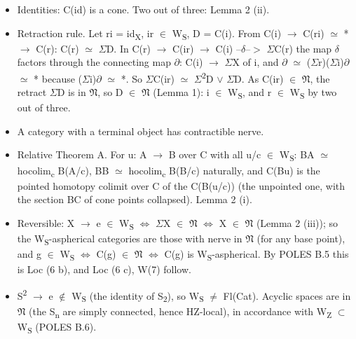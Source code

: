 \begin{itemize}
\item Identities: C(id) is a cone. Two out of three: Lemma 2 (ii).
\item Retraction rule. Let ri = id\textsubscript{X}, ir \ensuremath{\in} W\textsubscript{S}, D = C(i). From C(i) \ensuremath{\to} C(ri) \ensuremath{\simeq} * \ensuremath{\to} C(r): C(r) \ensuremath{\simeq} \ensuremath{\Sigma}D. In
  C(r) \ensuremath{\to} C(ir) \ensuremath{\to} C(i) --\ensuremath{\delta}--\ensuremath{>} \ensuremath{\Sigma}C(r) the map \ensuremath{\delta} factors through the connecting map \ensuremath{\partial}: C(i) \ensuremath{\to} \ensuremath{\Sigma}X of i, and
  \ensuremath{\partial} \ensuremath{\simeq} (\ensuremath{\Sigma}r)(\ensuremath{\Sigma}i)\ensuremath{\partial} \ensuremath{\simeq} * because (\ensuremath{\Sigma}i)\ensuremath{\partial} \ensuremath{\simeq} *. So \ensuremath{\Sigma}C(ir) \ensuremath{\simeq} \ensuremath{\Sigma}\textsuperscript{2}D \ensuremath{\vee} \ensuremath{\Sigma}D. As C(ir) \ensuremath{\in} \ensuremath{\mathfrak N}, the retract \ensuremath{\Sigma}D is in \ensuremath{\mathfrak N},
  so D \ensuremath{\in} \ensuremath{\mathfrak N} (Lemma 1): i \ensuremath{\in} W\textsubscript{S}, and r \ensuremath{\in} W\textsubscript{S} by two out of three.
\item A category with a terminal object has contractible nerve.
\item Relative Theorem A. For u: A \ensuremath{\to} B over C with all u/c \ensuremath{\in} W\textsubscript{S}: BA \ensuremath{\simeq} hocolim\textsubscript{c} B(A/c),
  BB \ensuremath{\simeq} hocolim\textsubscript{c} B(B/c) naturally, and C(Bu) is the pointed homotopy colimit over C of the C(B(u/c))
  (the unpointed one, with the section BC of cone points collapsed). Lemma 2 (i).
\item Reversible: X \ensuremath{\to} e \ensuremath{\in} W\textsubscript{S} \ensuremath{\Leftrightarrow} \ensuremath{\Sigma}X \ensuremath{\in} \ensuremath{\mathfrak N} \ensuremath{\Leftrightarrow} X \ensuremath{\in} \ensuremath{\mathfrak N} (Lemma 2 (iii)); so the W\textsubscript{S}-aspherical categories are those
  with nerve in \ensuremath{\mathfrak N} (for any base point), and g \ensuremath{\in} W\textsubscript{S} \ensuremath{\Leftrightarrow} C(g) \ensuremath{\in} \ensuremath{\mathfrak N} \ensuremath{\Leftrightarrow} C(g) is W\textsubscript{S}-aspherical. By POLES B.5
  this is Loc (6 b), and Loc (6 c), W(7) follow.
\item S\textsuperscript{2} \ensuremath{\to} e \ensuremath{\notin} W\textsubscript{S} (the identity of S\textsubscript{2}), so W\textsubscript{S} \ensuremath{\ne} Fl(Cat). Acyclic spaces are in \ensuremath{\mathfrak N} (the S\textsubscript{n} are simply
  connected, hence HZ-local), in accordance with W\textsubscript{Z} \ensuremath{\subset} W\textsubscript{S} (POLES B.6).
\end{itemize}

